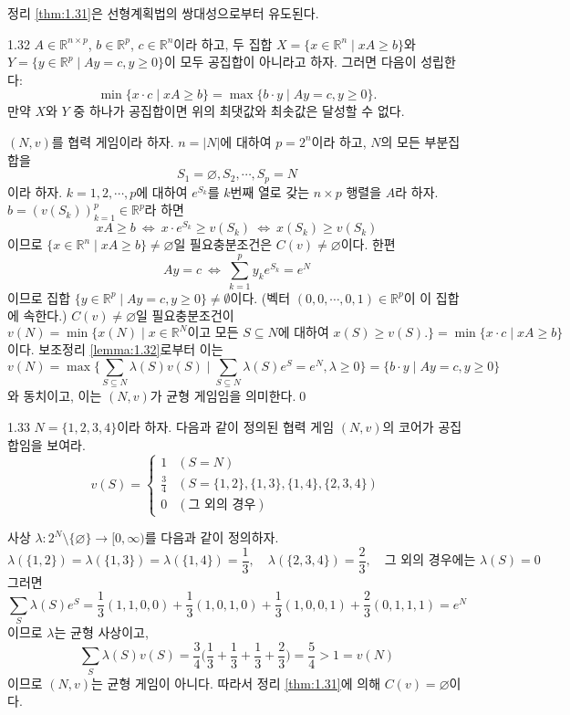 \documentclass{article}
\numberwithin{equation}{section}
\begin{document}
정리 \ref{thm:1.31}은 선형계획법의 쌍대성으로부터 유도된다.

\begin{lemma}{}{1.32}
	$A\in\mathbb R^{n\times p}$, $b\in\mathbb R^p$, $c\in\mathbb R^n$이라 하고, 두 집합 $X=\{x\in\mathbb R^n\mid xA\geq b\}$와 $Y=\{y\in\mathbb R^p\mid Ay=c,y\geq0\}$이 모두 공집합이 아니라고 하자. 그러면 다음이 성립한다:
	\[
		\min\{x\cdot c\mid xA\geq b\}=\max\{b\cdot y\mid Ay=c,y\geq0\}.
	\]
	만약 $X$와 $Y$ 중 하나가 공집합이면 위의 최댓값와 최솟값은 달성할 수 없다.
\end{lemma}

\begin{remark}
	$(N,v)$를 협력 게임이라 하자. $n=\vert N\vert$에 대하여 $p=2^n$이라 하고, $N$의 모든 부분집합을 
	\[
		S_1=\varnothing,S_2,\cdots,S_p=N
	\]
	이라 하자. $k=1,2,\cdots,p$에 대하여 $e^{S_k}$를 $k$번째 열로 갖는 $n\times p$ 행렬을 $A$라 하자. $b=(v(S_k))_{k=1}^p\in\mathbb R^p$라 하면
	\[
		xA\geq b~\Longleftrightarrow~x\cdot e^{S_k}\geq v(S_k)~\Longleftrightarrow~x(S_k)\geq v(S_k)
	\]
	이므로 $\{x\in\mathbb R^n\mid xA\geq b\}\ne\varnothing$일 필요충분조건은 $C(v)\ne\varnothing$이다. 한편
	\[
		Ay=c~\Longleftrightarrow~\sum_{k=1}^py_ke^{S_k}=e^N
	\]
	이므로 집합 $\{y\in\mathbb R^p\mid Ay=c,y\geq0\}\ne\emptyset$이다. (벡터 $(0,0,\cdots,0,1)\in\mathbb R^p$이 이 집합에 속한다.) $C(v)\ne\varnothing$일 필요충분조건이
	\[
		v(N)=\min\{x(N)\mid x\in\mathbb R^N\text{이고 모든 }S\subseteq N\text{에 대하여 }x(S)\geq v(S).\}=\min\{x\cdot c\mid xA\geq b\}
	\]
	이다. 보조정리 \ref{lemma:1.32}로부터 이는
	\[
		v(N)=\max\biggl\{\sum_{S\subseteq N}\lambda(S)v(S)\mid\sum_{S\subseteq N}\lambda(S)e^S=e^N,\lambda\geq0\biggr\}=\{b\cdot y\mid Ay=c,y\geq0\}
	\]
	와 동치이고, 이는 $(N,v)$가 균형 게임임을 의미한다.\qed
\end{remark}

\begin{prob}{}{1.33}
	$N=\{1,2,3,4\}$이라 하자. 다음과 같이 정의된 협력 게임 $(N,v)$의 코어가 공집합임을 보여라.
	\[
		v(S)=\begin{cases}
			1 & (S=N)\\
			\frac{3}{4} & (S=\{1,2\},\{1,3\},\{1,4\},\{2,3,4\})\\
			0 & (\text{그 외의 경우})
		\end{cases}
	\]
\end{prob}

\begin{sol}
	사상 $\lambda:2^N\setminus\{\varnothing\}\to[0,\infty)$를 다음과 같이 정의하자.
	\[
		\lambda(\{1,2\})=\lambda(\{1,3\})=\lambda(\{1,4\})=\frac{1}{3},\quad\lambda(\{2,3,4\})=\frac{2}{3},\quad\text{그 외의 경우에는 }\lambda(S)=0
	\]
	그러면
	\[
		\sum_S\lambda(S)e^S=\frac{1}{3}(1,1,0,0)+\frac{1}{3}(1,0,1,0)+\frac{1}{3}(1,0,0,1)+\frac{2}{3}(0,1,1,1)=e^N
	\]
	이므로 $\lambda$는 균형 사상이고,
	\[
		\sum_S\lambda(S)v(S)=\frac{3}{4}\biggl(\frac{1}{3}+\frac{1}{3}+\frac{1}{3}+\frac{2}{3}\biggr)=\frac{5}{4}>1=v(N)
	\]
	이므로 $(N,v)$는 균형 게임이 아니다. 따라서 정리 \ref{thm:1.31}에 의해 $C(v)=\varnothing$이다.
\end{sol}
\end{document}

